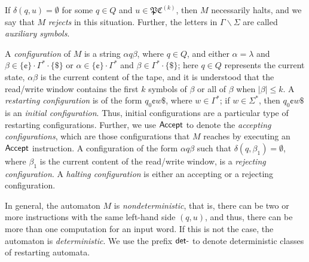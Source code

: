 If $\delta(q, u) = \emptyset$ for some $q \in Q$ and $u \in \mathfrak{PC}^{(k)}$, then $M$ necessarily halts, and we say that $M$ \emph{rejects} in this situation. Further, the letters in $\Gamma \backslash \Sigma$ are called \emph{auxiliary symbols}.

A \emph{configuration} of $M$ is a string $\alpha q \beta$, where $q \in Q$, and either $\alpha = \lambda$ and $\beta \in \{\cent\} \cdot \Gamma^* \cdot \{\$\}$ or $\alpha \in \{\cent\} \cdot \Gamma^*$ and $\beta \in \Gamma^* \cdot \{\$\}$; here $q \in Q$ represents the current state, $\alpha \beta$ is the current content of the tape, and it is understood that the read/write window contains the first $k$ symbols of $\beta$ or all of $\beta$ when $|\beta| \le k$. A \emph{restarting configuration} is of the form $q_0 \cent w \$$, where $w \in \Gamma^*$; if $w \in \Sigma^*$, then $q_0 \cent w \$$ is an \emph{initial configuration}. Thus, initial configurations are a particular type of restarting configurations. Further, we use \index{$\Accept$}$\Accept$ to denote the \emph{accepting configurations}, which are those configurations that $M$ reaches by executing an \index{$\Accept$}$\Accept$ instruction. A configuration of the form $\alpha q \beta$ such that $\delta(q, \beta_1) = \emptyset$, where $\beta_1$ is the current content of the read/write window, is a \emph{rejecting configuration}. A \emph{halting configuration} is either an accepting or a rejecting configuration.

In general, the automaton $M$ is \emph{nondeterministic}, that is, there can be two or more instructions with the same left-hand side $(q, u)$, and thus, there can be more than one computation for an input word. If this is not the case, the automaton is \emph{deterministic}. We use the prefix \index{$\detPrefix$}$\detPrefix$ to denote deterministic classes of restarting automata.

